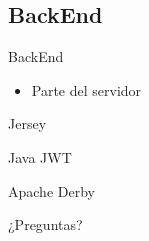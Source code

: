 \documentclass{beamer}
\begin{document}
        \subsection{BackEnd}

            \begin{frame}{BackEnd}
                \begin{itemize}
                    \item Parte del servidor
                \end{itemize}
            \end{frame}

            \begin{frame}{Jersey}

            \end{frame}

            \begin{frame}{Java JWT}

            \end{frame}

            \begin{frame}{Apache Derby}

            \end{frame}
    \begin{frame}[standout]
        ¿Preguntas?
    \end{frame}
\end{document}
